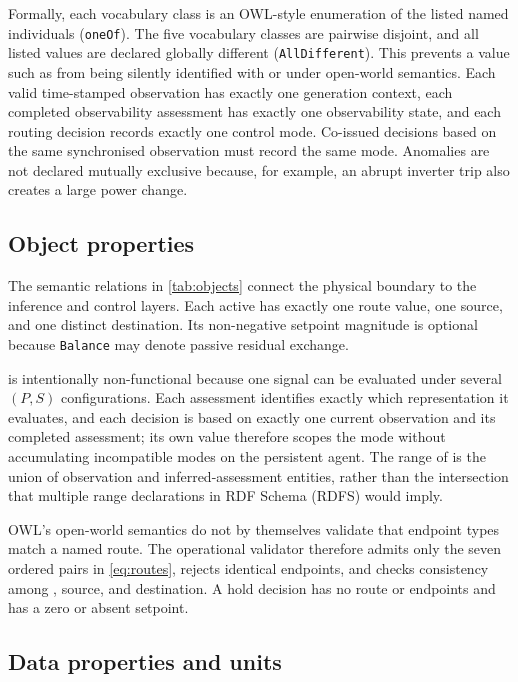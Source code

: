 Formally, each vocabulary class is an OWL-style enumeration of the listed named individuals (\texttt{oneOf}). The five vocabulary classes are pairwise disjoint, and all listed values are declared globally different (\texttt{AllDifferent}). This prevents a value such as  from being silently identified with  or  under open-world semantics. Each valid time-stamped observation has exactly one generation context, each completed observability assessment has exactly one observability state, and each routing decision records exactly one control mode. Co-issued decisions based on the same synchronised observation must record the same mode. Anomalies are not declared mutually exclusive because, for example, an abrupt inverter trip also creates a large power change.

\subsection{Object properties}

The semantic relations in \autoref{tab:objects} connect the physical boundary to the inference and control layers. Each active  has exactly one route value, one source, and one distinct destination. Its non-negative setpoint magnitude is optional because \texttt{Balance} may denote passive residual exchange.



 is intentionally non-functional because one signal can be evaluated under several $(P,S)$ configurations. Each assessment identifies exactly which representation it evaluates, and each decision is based on exactly one current observation and its completed assessment; its own  value therefore scopes the mode without accumulating incompatible modes on the persistent agent. The range of  is the union of observation and inferred-assessment entities, rather than the intersection that multiple range declarations in RDF Schema (RDFS) would imply.

OWL's open-world semantics do not by themselves validate that endpoint types match a named route. The operational validator therefore admits only the seven ordered pairs in \autoref{eq:routes}, rejects identical endpoints, and checks consistency among , source, and destination. A hold decision has no route or endpoints and has a zero or absent setpoint.

\subsection{Data properties and units}


